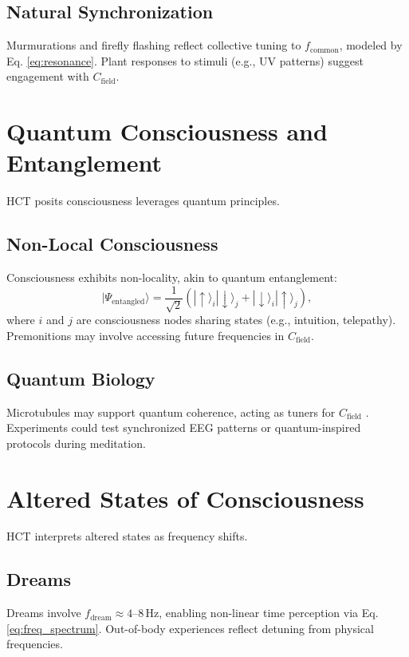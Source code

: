 \documentclass[a4paper,12pt]{article}
\begin{document}
\subsection{Natural Synchronization}
Murmurations and firefly flashing reflect collective tuning to $f_{\text{common}}$, modeled by Eq. \ref{eq:resonance}. Plant responses to stimuli (e.g., UV patterns) suggest engagement with $C_{\text{field}}$.

\section{Quantum Consciousness and Entanglement}
\label{sec:quantum}
HCT posits consciousness leverages quantum principles.

\subsection{Non-Local Consciousness}
Consciousness exhibits non-locality, akin to quantum entanglement:
\begin{equation}
|\Psi_{\text{entangled}}\rangle = \frac{1}{\sqrt{2}} (|\uparrow\rangle_i |\downarrow\rangle_j + |\downarrow\rangle_i |\uparrow\rangle_j),
\label{eq:entanglement}
\end{equation}
where $i$ and $j$ are consciousness nodes sharing states (e.g., intuition, telepathy). Premonitions may involve accessing future frequencies in $C_{\text{field}}$.

\subsection{Quantum Biology}
Microtubules may support quantum coherence, acting as tuners for $C_{\text{field}}$ \citep{PenroseHameroff1996}. Experiments could test synchronized EEG patterns or quantum-inspired protocols during meditation.

\section{Altered States of Consciousness}
\label{sec:altered_states}
HCT interprets altered states as frequency shifts.

\subsection{Dreams}
Dreams involve $f_{\text{dream}} \approx 4\text{--}8 \, \text{Hz}$, enabling non-linear time perception via Eq. \ref{eq:freq_spectrum}. Out-of-body experiences reflect detuning from physical frequencies.
\end{document}
